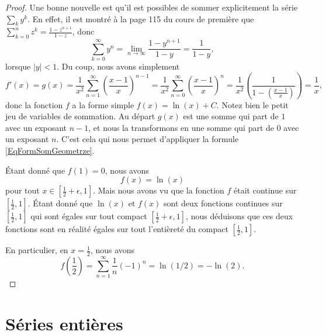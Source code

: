 \begin{proof}
	Une bonne nouvelle est qu'il est possibles de sommer explicitement la série $\sum_ky^k$. En effet, il est montré à la page 115 du cours de première que $\sum_{k=0}^n z^k=\frac{ 1-z^{n+1} }{ 1-z }$, donc
	\begin{equation}		\label{EqFormSomGeometrze}
		\sum_{k=0}^{\infty}y^n=\lim_{n\to\infty}\frac{1-y^{n+1}}{ 1-y }=\frac{1}{ 1-y },
	\end{equation}
	lorsque $| y |<1$. Du coup, nous avons simplement
	\begin{equation}
		f'(x)=g(x)=\frac{1}{ x^2 }\sum_{n=1}^{\infty}\left( \frac{ x-1 }{ x } \right)^{n-1}=\frac{1}{ x^2 }\sum_{n=0}^{\infty}\left( \frac{ x-1 }{ x } \right)^n=\frac{1}{ x^2 }\left( \frac{1}{  1-\left( \frac{ x-1 }{ x } \right)  } \right)=\frac{1}{ x },
	\end{equation}
	donc la fonction $f$ a la forme simple $f(x)=\ln(x)+C$. Notez bien le petit jeu de variables de sommation. Au départ $g(x)$ est une somme qui part de $1$ avec un exposant $n-1$, et nous la transformons en une somme qui part de $0$ avec un exposant $n$. C'est cela qui nous permet d'appliquer la formule \eqref{EqFormSomGeometrze}.

	Étant donné que $f(1)=0$, nous avons
	\begin{equation}
		f(x)=\ln(x)
	\end{equation}
	pour tout $x\in[\frac{ 1 }{2}+\epsilon,1]$. Mais nous avons vu que la fonction $f$ était continue sur $[\frac{ 1 }{2},1]$. Étant donné que $\ln(x)$ et $f(x)$ sont deux fonctions continues sur $[\frac{ 1 }{2},1]$ qui sont égales sur tout compact $[\frac{ 1 }{2}+\epsilon,1]$, nous déduisons que ces deux fonctions sont en réalité égales sur tout l'entièreté du compact $[\frac{ 1 }{2},1]$.

	En particulier, en $x=\frac{ 1 }{2}$, nous avons
	\begin{equation}
		f(\frac{ 1 }{2})=\sum_{n=1}^{\infty}\frac{1}{ n }(-1)^n=\ln(1/2)=-\ln(2).
	\end{equation}
\end{proof}

\section{Séries entières}

